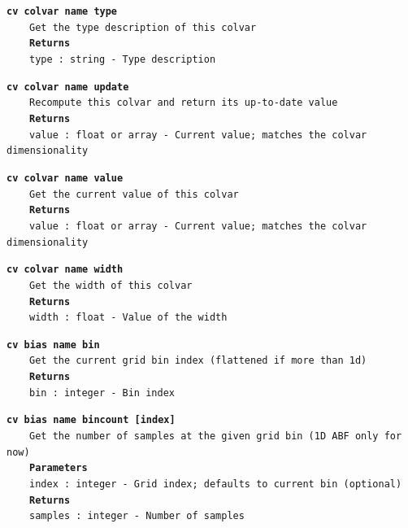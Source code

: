 \begin{mdexampleinput}{}
\texttt{\textbf{cv colvar name type}}
\\
\-~~~~\texttt{Get the type description of this colvar}
\\
\-~~~~\texttt{\textbf{Returns}}
\\
\-~~~~\texttt{type : string - Type description}
\end{mdexampleinput}
\begin{mdexampleinput}{}
\texttt{\textbf{cv colvar name update}}
\\
\-~~~~\texttt{Recompute this colvar and return its up-to-date value}
\\
\-~~~~\texttt{\textbf{Returns}}
\\
\-~~~~\texttt{value : float or array - Current value; matches the colvar dimensionality}
\end{mdexampleinput}
\begin{mdexampleinput}{}
\texttt{\textbf{cv colvar name value}}
\\
\-~~~~\texttt{Get the current value of this colvar}
\\
\-~~~~\texttt{\textbf{Returns}}
\\
\-~~~~\texttt{value : float or array - Current value; matches the colvar dimensionality}
\end{mdexampleinput}
\begin{mdexampleinput}{}
\texttt{\textbf{cv colvar name width}}
\\
\-~~~~\texttt{Get the width of this colvar}
\\
\-~~~~\texttt{\textbf{Returns}}
\\
\-~~~~\texttt{width : float - Value of the width}
\end{mdexampleinput}
\begin{mdexampleinput}{}
\texttt{\textbf{cv bias name bin}}
\\
\-~~~~\texttt{Get the current grid bin index (flattened if more than 1d)}
\\
\-~~~~\texttt{\textbf{Returns}}
\\
\-~~~~\texttt{bin : integer - Bin index}
\end{mdexampleinput}
\begin{mdexampleinput}{}
\texttt{\textbf{cv bias name bincount [index]}}
\\
\-~~~~\texttt{Get the number of samples at the given grid bin (1D ABF only for now)}
\\
\-~~~~\texttt{\textbf{Parameters}}
\\
\-~~~~\texttt{index : integer - Grid index; defaults to current bin (optional)}
\\
\-~~~~\texttt{\textbf{Returns}}
\\
\-~~~~\texttt{samples : integer - Number of samples}
\end{mdexampleinput}
